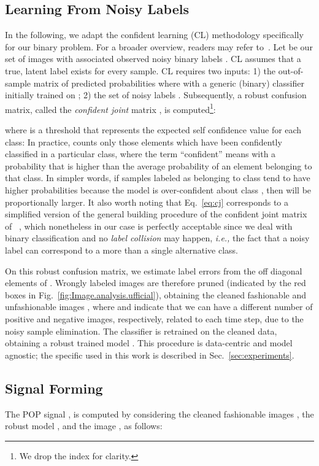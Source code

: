 \documentclass[runningheads]{llncs}
\newcommand{\snamebig}[0] {POP\xspace}
\begin{document}
\subsection{Learning From Noisy Labels}\label{sec:LFNL}
In the following, we adapt the confident learning (CL) methodology specifically for our binary problem. For a broader overview, readers may refer to~\cite{northcutt2021confident}. Let  be our set of  images with associated observed noisy binary labels . CL assumes that a true, latent label  exists for every sample. CL requires two inputs: 1) the out-of-sample  matrix  of predicted probabilities where  with  a generic (binary) classifier initially trained on ; 2) the set of noisy labels . Subsequently, a robust  confusion matrix, called the \emph{confident joint} matrix , is computed\footnote{We drop the index  for clarity.}:


where  is a threshold that represents the expected self confidence value for each class:
\label{eq:tj}
In practice,  counts only those elements which have been confidently classified in a particular class, where the term ``confident'' means with a probability that is higher than the average probability of an element belonging to that class. In simpler words, if samples labeled as belonging to class  tend to have higher probabilities because the model is over-confident about class , then  will be proportionally larger.
It also worth noting that Eq.~\ref{eq:cj} corresponds to a simplified version of the general building procedure of the confident joint matrix  of ~\cite{northcutt2021confident}, which nonetheless in our case is perfectly acceptable since we deal with binary classification and no \emph{label collision} may happen, \textit{i.e.,} the fact that a noisy label can correspond to a more than a single alternative class. 

On this robust confusion matrix, we estimate label errors from the off diagonal elements of . Wrongly labeled images are therefore pruned (indicated by the red boxes in Fig.~\ref{fig:Image.analysis.ufficial}), obtaining the cleaned fashionable and unfashionable images , where  and  indicate that we can have a different number of positive and negative images, respectively,  related to each  time step, due to the noisy sample elimination. The classifier is retrained on the cleaned data, obtaining a robust trained model . This procedure is data-centric and model agnostic; the specific  used in this work is described in Sec.~\ref{sec:experiments}.


\subsection{Signal Forming\label{sec:SF}}
The \snamebig signal , is computed by considering the cleaned fashionable images , the robust model , and the image , as follows:
\end{document}
